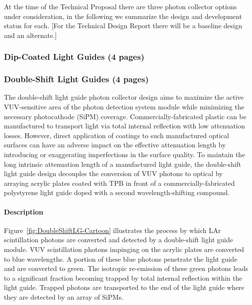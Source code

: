 At the time of the Technical Proposal there are three photon collector options  under consideration, 
in the following we summarize the design and development status for each. 
[For the Technical Design Report there will be a baseline design and an alternate.]

\subsubsection{Dip-Coated Light Guides (4 pages)}
\label{ssec:fdsp-pd-pc-bar1}

\subsubsection{Double-Shift Light Guides (4 pages)}
\label{ssec:fdsp-pd-pc-bar2}
The double-shift light guide photon collector design aims to maximize the active VUV-sensitive 
area of the photon detection system module while minimizing the necessary photocathode (SiPM) 
coverage. 
Commercially-fabricated plastic can be manufactured to transport light via total internal 
reflection with low attenuation losses. However, direct application of coatings to such
 manufactured optical surfaces can have an adverse impact on the effective attenuation length 
by introducing or exaggerating imperfections in the surface quality. 
To maintain the long intrinsic attenuation length of a manufactured light guide, the 
double-shift light guide design decouples the conversion of VUV photons to optical by
 arraying acrylic plates coated with TPB in front of a commercially-fabricated polystyrene 
light guide doped with a second wavelength-shifting compound.

\paragraph*{Description}

Figure~\ref{fig:DoubleShiftLG-Cartoon} illustrates the process by which LAr scintillation 
photons are converted and detected by a double-shift light guide module. VUV scintillation
 photons impinging on the acrylic plates are converted to blue wavelengths. A portion of
 these blue photons penetrate the light guide and are converted to green. The isotropic 
re-emission of these green photons leads to a significant fraction becoming trapped by 
total internal reflection within the light guide. Trapped photons are transported to 
the end of the light guide where they are detected by an array of SiPMs.

